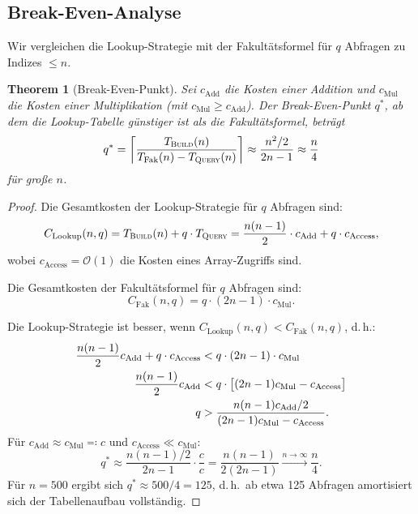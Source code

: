 ﻿\documentclass[12pt, a4paper]{article}
\newcommand{\Oh}{\mathcal{O}}
\newcommand{\build}{\textsc{Build}}
\newcommand{\query}{\textsc{Query}}
\theoremstyle{plain}
\newtheorem{theorem}{Theorem}[section]
\theoremstyle{definition}
\theoremstyle{remark}
\renewcommand{\Oh}{\mathcal{O}}
\renewcommand{\build}{\textsc{Build}}
\renewcommand{\query}{\textsc{Query}}
\begin{document}
\subsection{Break-Even-Analyse}

Wir vergleichen die Lookup-Strategie mit der Fakultätsformel für $q$
Abfragen zu Indizes $\le n$.

\begin{theorem}[Break-Even-Punkt]
  \label{thm:breakeven}
  Sei $c_{\text{Add}}$ die Kosten einer Addition und $c_{\text{Mul}}$
  die Kosten einer Multiplikation (mit $c_{\text{Mul}} \ge c_{\text{Add}}$).
  Der Break-Even-Punkt $q^*$, ab dem die Lookup-Tabelle günstiger ist
  als die Fakultätsformel, beträgt
  \begin{equation}
    q^* = \left\lceil \frac{T_{\build}(n)}{T_{\text{Fak}}(n) - T_{\query}(n)} \right\rceil
        \approx \frac{n^2/2}{2n - 1}
        \approx \frac{n}{4}
    \label{eq:breakeven}
  \end{equation}
  für große $n$.
\end{theorem}

\begin{proof}
  Die Gesamtkosten der Lookup-Strategie für $q$ Abfragen sind:
  \begin{equation}
    C_{\text{Lookup}}(n, q)
    = T_{\build}(n) + q \cdot T_{\query}
    = \frac{n(n-1)}{2} \cdot c_{\text{Add}} + q \cdot c_{\text{Access}},
    \label{eq:cost_lookup}
  \end{equation}
  wobei $c_{\text{Access}} = \Oh(1)$ die Kosten eines Array-Zugriffs sind.

  Die Gesamtkosten der Fakultätsformel für $q$ Abfragen sind:
  \begin{equation}
    C_{\text{Fak}}(n, q) = q \cdot (2n - 1) \cdot c_{\text{Mul}}.
    \label{eq:cost_fak}
  \end{equation}

  Die Lookup-Strategie ist besser, wenn
  $C_{\text{Lookup}}(n, q) < C_{\text{Fak}}(n, q)$, d.\,h.:
  \begin{align}
    \frac{n(n-1)}{2} c_{\text{Add}} + q \cdot c_{\text{Access}}
    &< q \cdot (2n-1) \cdot c_{\text{Mul}} \notag\\
    \frac{n(n-1)}{2} c_{\text{Add}}
    &< q \cdot \bigl[(2n-1) c_{\text{Mul}} - c_{\text{Access}}\bigr] \notag\\
    q &> \frac{n(n-1) c_{\text{Add}} / 2}{(2n-1) c_{\text{Mul}} - c_{\text{Access}}}.
  \end{align}
  Für $c_{\text{Add}} \approx c_{\text{Mul}} \eqqcolon c$ und
  $c_{\text{Access}} \ll c_{\text{Mul}}$:
  \begin{equation}
    q^* \approx \frac{n(n-1)/2}{2n - 1} \cdot \frac{c}{c}
              = \frac{n(n-1)}{2(2n-1)}
              \xrightarrow{n \to \infty} \frac{n}{4}.
  \end{equation}
  Für $n = 500$ ergibt sich $q^* \approx 500/4 = 125$, d.\,h.\ ab
  etwa 125 Abfragen amortisiert sich der Tabellenaufbau vollständig.
\end{proof}
\end{document}
